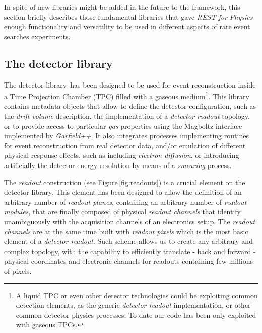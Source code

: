 In spite of new libraries might be added in the future to the framework, this section briefly describes those fundamental libraries that gave \emph{REST-for-Physics} enough functionality and versatility to be used in different aspects of rare event searches experiments.

\subsection{The detector library}

The detector library\,\cite{REST_Detector_Git} has been designed to be used for event reconstruction inside a Time Projection Chamber (TPC) filled with a gaseous medium\footnote{A liquid TPC or even other detector technologies could be exploiting common detection elements, as the generic \emph{detector readout} implementation, or other common detector physics processes. To date our code has been only exploited with gaseous TPCs.}. This library contains metadata objects that allow to define the detector configuration, such as the \emph{drift volume} description, the implementation of a \emph{detector readout} topology, or to provide access to particular \emph{gas} properties using the Magboltz interface implemented by \emph{Garfield++}. It also integrates processes implementing routines for event reconstruction from real detector data, and/or emulation of different physical response effects, such as including \emph{electron diffusion}, or introducing artificially the detector energy resolution by means of a \emph{smearing} process.

The \emph{readout} construction (see Figure\,\ref{fig:readouts}) is a crucial element on the detector library. This element has been designed to allow the definition of an arbitrary number of \emph{readout planes}, containing an arbitrary number of \emph{readout modules}, that are finally composed of physical \emph{readout channels} that identify unambiguously with the acquisition channels of an electronics setup. The \emph{readout channels} are at the same time built with \emph{readout pixels} which is the most basic element of a \emph{detector readout}. Such scheme allows us to create any arbitrary and complex topology, with the capability to efficiently translate - back and forward - physical coordinates and electronic channels for readouts containing few millions of pixels.

